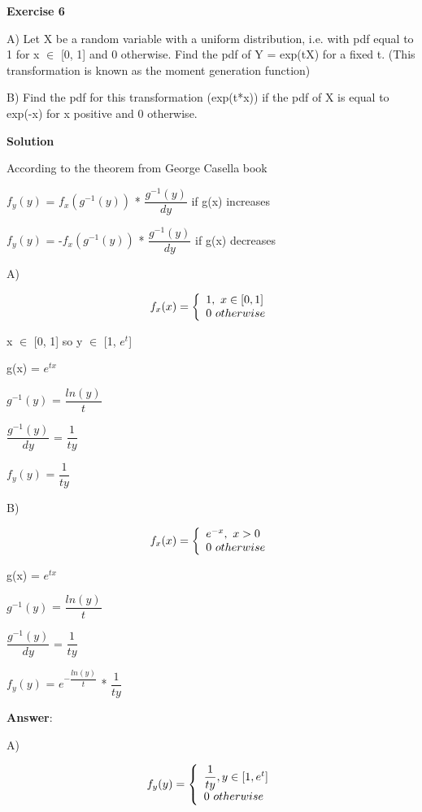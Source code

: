 \documentclass[12pt]{article}
\theoremstyle{definiton}
\theoremstyle{definition}
\theoremstyle{definition}
\begin{document}
		\bigskip

		
		\textbf{Exercise 6}

A)  Let X be a random variable with a uniform distribution, i.e. with pdf equal to 1 for
x $\in$ [0, 1] and 0 otherwise. Find the pdf of Y = exp(tX) for a fixed t. (This transformation is known as the moment generation function)

B) Find the pdf for this transformation (exp(t*x)) if the pdf of X is equal to exp(-x) for x positive and 0 otherwise.
		
		\medskip
		
		\textbf{Solution}
		
According to the theorem from George Casella book
\medskip

$f_y(y)$ = $f_x(g^{-1}(y))$ * $\dfrac{g^{-1}(y)}{dy}$ if g(x) increases
\medskip

$f_y(y)$ = -$f_x(g^{-1}(y))$ * $\dfrac{g^{-1}(y)}{dy}$ if g(x) decreases
\medskip

A) 
\medskip

\[f_x(x) = \left\{
\begin{array}{l l}
  1,\ x \in [0, 1]\\
  0\ otherwise
\end{array} \right.\]
\medskip

x $\in$ [0, 1] so 
y $\in$ [1, $e^t$]
\medskip

g(x) = $e^{tx}$	
\medskip

$g^{-1}(y)$ = $\dfrac{ln(y)}{t}$
\medskip

$\dfrac{g^{-1}(y)}{dy}$ = $\dfrac{1}{ty}$
\medskip

$f_y(y)$ = $\dfrac{1}{ty}$
\medskip

B)
\medskip

\[f_x(x) = \left\{
\begin{array}{l l}
  e^{-x},\ x > 0\\
  0\ otherwise
\end{array} \right.\]
\medskip

g(x) = $e^{tx}$	
\medskip

$g^{-1}(y)$ = $\dfrac{ln(y)}{t}$
\medskip

$\dfrac{g^{-1}(y)}{dy}$ = $\dfrac{1}{ty}$
\medskip

$f_y(y)$ = $e^{-\dfrac{ln(y)}{t}}$ * $\dfrac{1}{ty}$
\medskip


		\medskip
		\textbf{Answer}:

A)
\medskip

\[f_y(y) = \left\{
\begin{array}{l l}
  \dfrac{1}{ty}, y \in [1, e^t]\\
  0\ otherwise
\end{array} \right.\]
\end{document}
